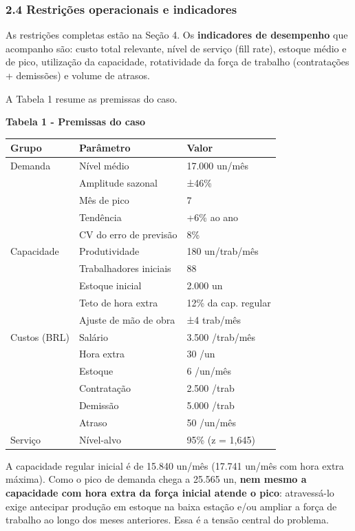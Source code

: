 \documentclass[
  brazilian,
  12pt,
]{article}
\newcounter{none} %
\begin{document}
\subsubsection{2.4 Restrições operacionais e
indicadores}\label{restriuxe7uxf5es-operacionais-e-indicadores}

As restrições completas estão na Seção 4. Os \textbf{indicadores de
desempenho} que acompanho são: custo total relevante, nível de serviço
(fill rate), estoque médio e de pico, utilização da capacidade,
rotatividade da força de trabalho (contratações + demissões) e volume de
atrasos.

A Tabela 1 resume as premissas do caso.

\textbf{Tabela 1 - Premissas do caso}

{\def\LTcaptype{none} %
\begin{longtable}[]{@{}lll@{}}
\toprule\noalign{}
Grupo & Parâmetro & Valor \\
\midrule\noalign{}
\endhead
\bottomrule\noalign{}
\endlastfoot
Demanda & Nível médio & 17.000 un/mês \\
& Amplitude sazonal & ±46\% \\
& Mês de pico & 7 \\
& Tendência & +6\% ao ano \\
& CV do erro de previsão & 8\% \\
Capacidade & Produtividade & 180 un/trab/mês \\
& Trabalhadores iniciais & 88 \\
& Estoque inicial & 2.000 un \\
& Teto de hora extra & 12\% da cap. regular \\
& Ajuste de mão de obra & ±4 trab/mês \\
Custos (BRL) & Salário & 3.500 /trab/mês \\
& Hora extra & 30 /un \\
& Estoque & 6 /un/mês \\
& Contratação & 2.500 /trab \\
& Demissão & 5.000 /trab \\
& Atraso & 50 /un/mês \\
Serviço & Nível-alvo & 95\% (z = 1,645) \\
\end{longtable}
}

A capacidade regular inicial é de 15.840 un/mês (17.741 un/mês com hora
extra máxima). Como o pico de demanda chega a 25.565 un, \textbf{nem
mesmo a capacidade com hora extra da força inicial atende o pico}:
atravessá-lo exige antecipar produção em estoque na baixa estação e/ou
ampliar a força de trabalho ao longo dos meses anteriores. Essa é a
tensão central do problema.
\end{document}
